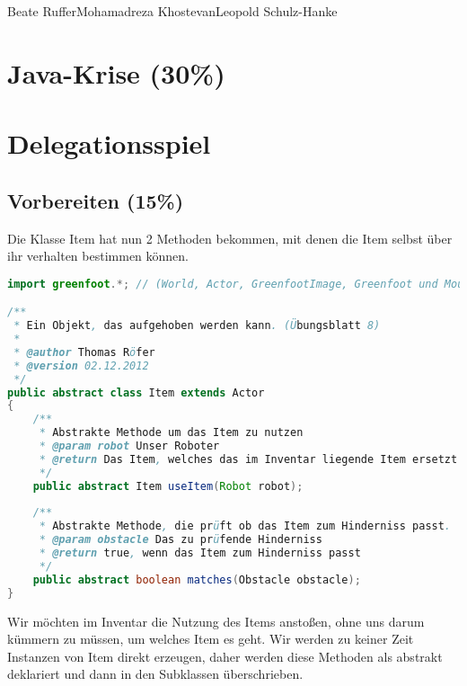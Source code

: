 \documentclass{pi1}
\begin{document}
		{Beate Ruffer}{Mohamadreza Khostevan}{Leopold Schulz-Hanke}

\section{Java-Krise (30\%)}

\section{Delegationsspiel}

\subsection{Vorbereiten (15\%)}

Die Klasse Item hat nun 2 Methoden bekommen, mit denen die Item selbst über ihr verhalten bestimmen können.
\begin{lstlisting}[caption={Klasse \emph{Item}}, firstnumber=1, language=Java]
import greenfoot.*; // (World, Actor, GreenfootImage, Greenfoot und MouseInfo)

/**
 * Ein Objekt, das aufgehoben werden kann. (Übungsblatt 8)
 * 
 * @author Thomas Röfer
 * @version 02.12.2012
 */
public abstract class Item extends Actor
{
    /**
     * Abstrakte Methode um das Item zu nutzen
     * @param robot Unser Roboter
     * @return Das Item, welches das im Inventar liegende Item ersetzt
     */
    public abstract Item useItem(Robot robot);
    
    /**
     * Abstrakte Methode, die prüft ob das Item zum Hinderniss passt.
     * @param obstacle Das zu prüfende Hinderniss
     * @return true, wenn das Item zum Hinderniss passt
     */
    public abstract boolean matches(Obstacle obstacle);
}
\end{lstlisting}

Wir möchten im Inventar die Nutzung des Items anstoßen, ohne uns darum kümmern zu müssen, um welches Item es geht.
Wir werden zu keiner Zeit Instanzen von Item direkt erzeugen, daher werden diese Methoden als abstrakt deklariert und dann in den Subklassen überschrieben.
\end{document}
